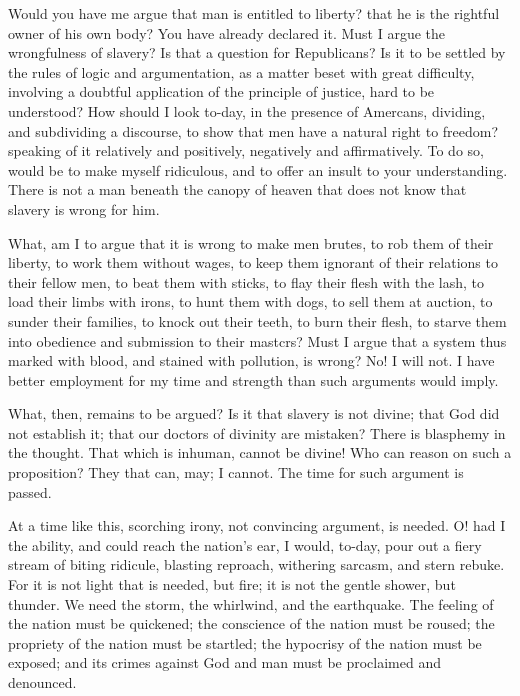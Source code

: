 \documentclass[a4paper]{amsbook}
\begin{document}
Would you have me argue that man is entitled to liberty? that he is the rightful owner of his own body? You have already declared it. Must I argue the wrongfulness of slavery? Is that a question for Republicans? Is it to be settled by the rules of logic and argumentation, as a matter beset with great difficulty, involving a doubtful application of the principle of justice, hard to be understood? How should I look to-day, in the presence of Amercans, dividing, and subdividing a discourse, to show that men have a natural right to freedom? speaking of it relatively and positively, negatively and affirmatively. To do so, would be to make myself ridiculous, and to offer an insult to your understanding. There is not a man beneath the canopy of heaven that does not know that slavery is wrong for him.

What, am I to argue that it is wrong to make men brutes, to rob them of their liberty, to work them without wages, to keep them ignorant of their relations to their fellow men, to beat them with sticks, to flay their flesh with the lash, to load their limbs with irons, to hunt them with dogs, to sell them at auction, to sunder their families, to knock out their teeth, to burn their flesh, to starve them into obedience and submission to their mastcrs? Must I argue that a system thus marked with blood, and stained with pollution, is wrong? No! I will not. I have better employment for my time and strength than such arguments would imply.

What, then, remains to be argued? Is it that slavery is not divine; that God did not establish it; that our doctors of divinity are mistaken? There is blasphemy in the thought. That which is inhuman, cannot be divine! Who can reason on such a proposition? They that can, may; I cannot. The time for such argument is passed.

At a time like this, scorching irony, not convincing argument, is needed. O! had I the ability, and could reach the nation's ear, I would, to-day, pour out a fiery stream of biting ridicule, blasting reproach, withering sarcasm, and stern rebuke. For it is not light that is needed, but fire; it is not the gentle shower, but thunder. We need the storm, the whirlwind, and the earthquake. The feeling of the nation must be quickened; the conscience of the nation must be roused; the propriety of the nation must be startled; the hypocrisy of the nation must be exposed; and its crimes against God and man must be proclaimed and denounced.
\end{document}
